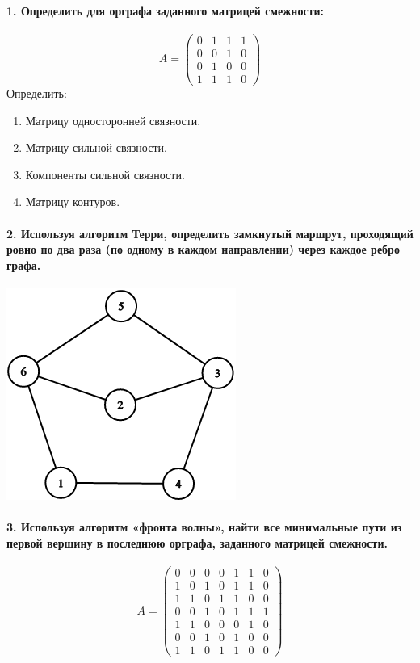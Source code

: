 \documentclass[12pt,a4paper]{article}
\begin{document}
\paragraph*{1. Определить для орграфа заданного матрицей смежности:}
   \[
      A = \begin{pmatrix}
         0 & 1 & 1 & 1 \\
         0 & 0 & 1 & 0 \\
         0 & 1 & 0 & 0 \\
         1 & 1 & 1 & 0
      \end{pmatrix}
   \]
   Определить:
   \begin{enumerate}[label=(\alph*)]
      \item Матрицу односторонней связности.
      \item Матрицу сильной связности.
      \item Компоненты сильной связности.
      \item Матрицу контуров.
   \end{enumerate}

\paragraph*{2. Используя алгоритм Терри, определить замкнутый маршрут, проходящий ровно по два раза (по одному в каждом направлении) через каждое ребро графа.}
\begin{center}
   \includegraphics[scale=0.5]{terry.png}
\end{center}

\paragraph*{3. Используя алгоритм «фронта волны», найти все минимальные пути из первой вершину в последнюю орграфа, заданного матрицей смежности.}
   \[
      A = \begin{pmatrix}
         0 & 0 & 0 & 0 & 1 & 1 & 0 \\
         1 & 0 & 1 & 0 & 1 & 1 & 0 \\
         1 & 1 & 0 & 1 & 1 & 0 & 0 \\
         0 & 0 & 1 & 0 & 1 & 1 & 1 \\
         1 & 1 & 0 & 0 & 0 & 1 & 0 \\
         0 & 0 & 1 & 0 & 1 & 0 & 0 \\
         1 & 1 & 0 & 1 & 1 & 0 & 0
      \end{pmatrix}
   \]
\end{document}
